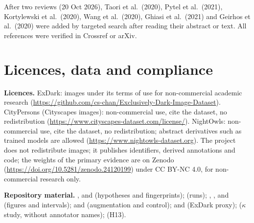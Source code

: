 \documentclass[10pt]{article}
\begin{document}
\noindent  After two reviews (20 Oct 2026), Taori et al.\ (2020), Pytel et al.\ (2021), Kortylewski et al.\ (2020), Wang et al.\ (2020), Ghiasi et al.\ (2021) and Geirhos et al.\ (2020) were added by targeted search after reading their abstract or text. All references were verified in Crossref or arXiv.

\section{Licences, data and compliance}
\noindent\textbf{Licences.} ExDark: images under its terms of use for non-commercial academic research (\url{https://github.com/cs-chan/Exclusively-Dark-Image-Dataset}). CityPersons (Cityscapes images): non-commercial use, cite the dataset, no redistribution (\url{https://www.cityscapes-dataset.com/license/}). NightOwls: non-commercial use, cite the dataset, no redistribution; abstract derivatives such as trained models are allowed (\url{https://www.nightowls-dataset.org}). The project does not redistribute images; it publishes identifiers, derived annotations and code; the weights of the primary evidence are on Zenodo (\url{https://doi.org/10.5281/zenodo.24120199}) under CC BY-NC 4.0, for non-commercial research only.

\noindent\textbf{Repository material.} ,  and  (hypotheses and fingerprints);  (runs); , ,  and  (figures and intervals);  and  (augmentation and control);  and  (ExDark proxy);  ($\kappa$ study, without annotator names);  (H13).
\end{document}
